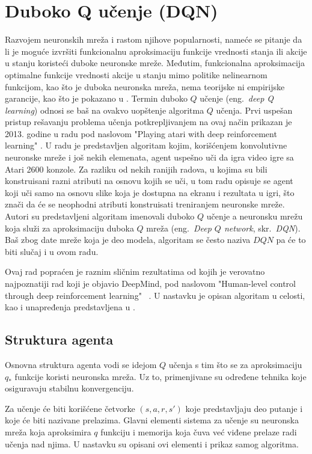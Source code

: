 \chapter{Duboko Q učenje (DQN)}
\label{ch:dqn}

Razvojem neuronskih mreža i rastom njihove popularnosti, nameće se pitanje da li je moguće izvršiti funkcionalnu aproksimaciju funkcije vrednosti stanja ili akcije u stanju koristeći duboke neuronske mreže. Međutim, funkcionalna aproksimacija optimalne funkcije vrednosti akcije u stanju mimo politike nelinearnom funkcijom, kao što je duboka neuronska mreža, nema teorijske ni empirijske garancije, kao što je pokazano u \cite{q_nn_div}.  Termin duboko $Q$ učenje (eng.~{\em deep Q learning}) odnosi se baš na ovakvo uopštenje algoritma $Q$ učenja. Prvi uspešan pristup rešavanju problema učenja potkrepljivanjem na ovaj način prikazan je 2013. godine u radu pod naslovom "Playing atari with deep reinforcement learning" \cite{dqn_mnih}. U radu je predstavljen algoritam kojim, korišćenjem konvolutivne neuronske mreže i još nekih elemenata, agent uspešno uči da igra video igre sa Atari 2600 konzole. Za razliku od nekih ranijih radova, u kojima su bili konstruisani razni atributi na osnovu kojih se uči, u tom radu opisuje se agent koji uči samo na osnovu slike koja je dostupna na ekranu i rezultata u igri, što znači da će se neophodni atributi konstruisati treniranjem neuronske mreže. 
Autori su predstavljeni algoritam imenovali duboko $Q$ učenje a neuronsku mrežu koja služi za aproksimaciju duboka $Q$ mreža (eng.~{\em Deep $Q$ network}, skr.~{\em DQN}). Baš zbog date mreže koja je deo modela, algoritam se često naziva $DQN$ pa će to biti slučaj i u ovom radu.
\par 
Ovaj rad popraćen je raznim sličnim rezultatima od kojih je verovatno najpoznatiji rad koji je objavio DeepMind, pod naslovom "Human-level control through deep reinforcement learning" ~\cite{dqn_dm}.  U nastavku je opisan algoritam u celosti, kao i unapređenja predstavljena u \cite{dqn_dm}.

\section{Struktura agenta}

Osnovna struktura agenta vodi se idejom $Q$ učenja s tim što se za aproksimaciju $q_*$ funkcije koristi neuronska mreža. Uz to, primenjivane su određene tehnika koje osiguravaju stabilnu konvergenciju. 
\par 
Za učenje će biti korišćene četvorke $(s, a, r, s')$ koje predstavljaju deo putanje i koje će biti nazivane prelazima. Glavni elementi sistema za učenje su neuronska mreža koja aproksimira $q$ funkciju i memorija koja čuva već viđene prelaze radi učenja nad njima. U nastavku su opisani ovi elementi i prikaz samog algoritma.

